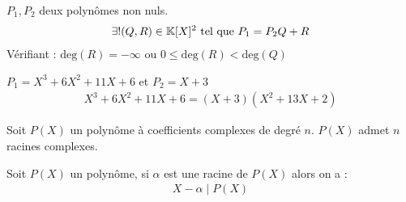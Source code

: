 \begin{graybox}
    \begin{theoreme}
        $P_1, P_2$ deux polynômes non nuls.
        \begin{align*}
            \exists ! (Q, R) \in \mathbb{K}[X]^2 \text{ tel que } P_1 = P_2 Q + R 
        \end{align*}
        Vérifiant :
             $\mathrm{deg}(R) = -\infty$ ou $0 \leq \mathrm{deg}(R) < \mathrm{deg}(Q)$
    \end{theoreme}
\end{graybox}

\begin{exemple}
$P_1 = X^3 + 6X^2 + 11X + 6$ et $P_2 = X + 3$
\begin{align*}
X^3 + 6X^2 + 11X + 6 = (X+3)(X^2 + 13X + 2)  
\end{align*}
\end{exemple}

\begin{graybox}
\begin{theoreme}
Soit $P(X)$ un polynôme à coefficients complexes de degré $n$. $P(X)$ admet $n$ racines complexes. 
\end{theoreme}
\end{graybox}

\begin{graybox}
\begin{proposition}
Soit $P(X)$ un polynôme, si $\alpha$ est une racine de $P(X)$ alors on a :
\begin{align*}
X - \alpha \mid P(X)
\end{align*}
\end{proposition}
\end{graybox}